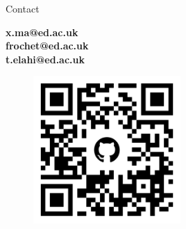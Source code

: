 \documentclass[final]{beamer}
\newlength{\rightcolwidth}
\begin{document}
\begin{frame}[t]
\begin{columns}[t]
\begin{column}{\rightcolwidth}

\vspace{-1cm}
  \begin{block}{Contact}
  \begin{minipage}[t]{0.2\rightcolwidth}
  \end{minipage}
  \hfill
  \begin{minipage}[t]{0.3\rightcolwidth}
 \centering
    \textbf{x.ma@ed.ac.uk}\\
    \textbf{frochet@ed.ac.uk}\\
    \textbf{t.elahi@ed.ac.uk}
  \end{minipage}
  \hfil
  \begin{minipage}[t]{0.3\rightcolwidth}
  \vspace{-1cm}
  \begin{figure}
  \includegraphics[width=0.5\textwidth]{images/artifact.png}
  \end{figure}
  \end{minipage}
  \hfill
  \begin{minipage}[t]{0.2\rightcolwidth}
  \end{minipage}


\end{block}
\end{column}
\end{columns}
\end{frame}
\end{document}
